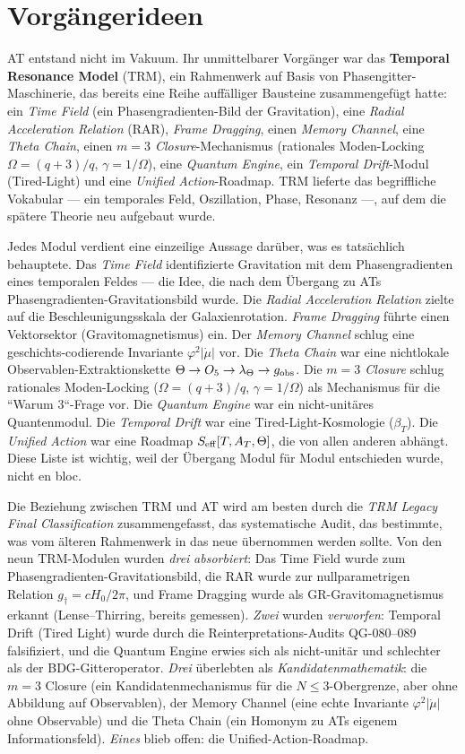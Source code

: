 \documentclass[10pt,twoside,openany]{book}
\begin{document}
\section{Vorgängerideen}

AT entstand nicht im Vakuum. Ihr unmittelbarer Vorgänger war das \textbf{Temporal
Resonance Model} (TRM), ein Rahmenwerk auf Basis von Phasengitter-Maschinerie, das bereits
eine Reihe auffälliger Bausteine zusammengefügt hatte: ein \emph{Time Field} (ein
Phasengradienten-Bild der Gravitation), eine \emph{Radial Acceleration Relation} (RAR),
\emph{Frame Dragging}, einen \emph{Memory Channel}, eine \emph{Theta Chain}, einen
\emph{$m=3$ Closure}-Mechanismus (rationales Moden-Locking $\Omega=(q+3)/q$,
$\gamma=1/\Omega$), eine \emph{Quantum Engine}, ein \emph{Temporal Drift}-Modul
(Tired-Light) und eine \emph{Unified Action}-Roadmap. TRM lieferte das begriffliche
Vokabular --- ein temporales Feld, Oszillation, Phase, Resonanz ---, auf dem die spätere
Theorie neu aufgebaut wurde.

Jedes Modul verdient eine einzeilige Aussage darüber, was es tatsächlich behauptete. Das
\emph{Time Field} identifizierte Gravitation mit dem Phasengradienten eines temporalen
Feldes --- die Idee, die nach dem Übergang zu ATs Phasengradienten-Gravitationsbild wurde.
Die \emph{Radial Acceleration Relation} zielte auf die Beschleunigungsskala der
Galaxienrotation. \emph{Frame Dragging} führte einen Vektorsektor (Gravitomagnetismus) ein.
Der \emph{Memory Channel} schlug eine geschichts-codierende Invariante $\varphi^2|\dot\mu|$
vor. Die \emph{Theta Chain} war eine nichtlokale Observablen-Extraktionskette
$\Theta\to O_5\to\lambda_\Theta\to g_{\rm obs}$. Die \emph{$m=3$ Closure} schlug rationales
Moden-Locking ($\Omega=(q+3)/q$, $\gamma=1/\Omega$) als Mechanismus für die ``Warum 3``-Frage
vor. Die \emph{Quantum Engine} war ein nicht-unitäres Quantenmodul. Die \emph{Temporal
Drift} war eine Tired-Light-Kosmologie ($\beta_T$). Die \emph{Unified Action} war eine
Roadmap $S_{\rm eff}[T,A_T,\Theta]$, die von allen anderen abhängt. Diese Liste ist
wichtig, weil der Übergang Modul für Modul entschieden wurde, nicht en bloc.

Die Beziehung zwischen TRM und AT wird am besten durch die \emph{TRM Legacy Final
Classification} zusammengefasst, das systematische Audit, das bestimmte, was vom älteren
Rahmenwerk in das neue übernommen werden sollte. Von den neun TRM-Modulen wurden
\emph{drei} \emph{absorbiert}: Das Time Field wurde zum Phasengradienten-Gravitationsbild,
die RAR wurde zur nullparametrigen Relation $g_\dagger = cH_0/2\pi$, und Frame Dragging
wurde als GR-Gravitomagnetismus erkannt (Lense--Thirring, bereits gemessen). \emph{Zwei}
wurden \emph{verworfen}: Temporal Drift (Tired Light) wurde durch die
Reinterpretations-Audits QG-080--089 falsifiziert, und die Quantum Engine erwies sich als
nicht-unitär und schlechter als der BDG-Gitteroperator. \emph{Drei} überlebten als
\emph{Kandidatenmathematik}: die $m=3$ Closure (ein Kandidatenmechanismus für die
$N\le3$-Obergrenze, aber ohne Abbildung auf Observablen), der Memory Channel (eine echte
Invariante $\varphi^2|\dot\mu|$ ohne Observable) und die Theta Chain (ein Homonym zu ATs
eigenem Informationsfeld). \emph{Eines} blieb offen: die Unified-Action-Roadmap.
\end{document}
